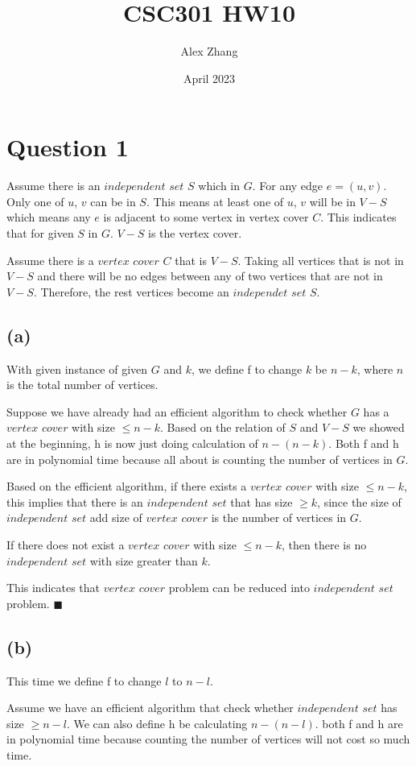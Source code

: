 \documentclass{article}
\title{CSC301 HW10}
\author{Alex Zhang}
\date{April 2023}
\begin{document}
\maketitle
\section*{Question 1}

Assume there is an $independent$ $set$ $S$ which in $G$. For any edge $e = (u,v)$. Only one of $u$, $v$ can be in
$S$. This means at least one of $u$, $v$ will be in $V-S$ which means any $e$ is adjacent to some vertex in  vertex cover $C$.
This indicates that for given $S$ in $G$. $V-S$ is the vertex cover.

Assume there is a $vertex$ $cover$ $C$ that is $V-S$. Taking all vertices that is not in $V-S$ and there will be no edges between any of two
vertices that are not in $V-S$. Therefore, the rest vertices become an $independet$ $set$ $S$.
\subsection*{(a)}
With given instance of given $G$ and $k$, we define f to change $k$ be $n-k$, where $n$ is the total number
of vertices.

Suppose we have already had an efficient algorithm to check whether $G$ has a $vertex$ $cover$ with size $\leq n-k$. 
Based on the relation of $S$ and $V-S$ we showed at the beginning, h is now just doing calculation of $n-(n-k)$.
Both f and h are in polynomial time because all about is counting the number of vertices in $G$.

Based on the efficient algorithm, if there exists a $vertex$ $cover$ with size $\leq n-k$, this implies that there is an $independent$ $set$ that has size
$\geq k$, since the size of $independent$ $set$ add size of $vertex$ $cover$ is the number of vertices in $G$.

If there does not exist a $vertex$ $cover$ with size $\leq n-k$, then there is no $independent$ $set$ with size greater than $k$.

This indicates that $vertex$ $cover$ problem can be reduced into $independent$ $set$ problem. $\blacksquare$

\subsection*{(b)}
This time we define f to change $l$ to $n-l$.

Assume we have an efficient algorithm that check whether $independent$ $set$ has size $\geq n-l$. We can also define h be calculating $n - (n-l)$. both 
f and h are in polynomial time because counting the number of vertices will not cost so much time.
\end{document}
